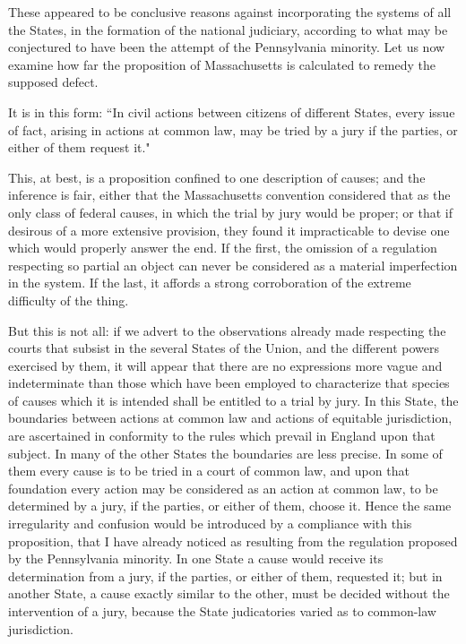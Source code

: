 These appeared to be conclusive reasons against incorporating the systems of all the States, in the formation of the national judiciary, according to what may be conjectured to have been the attempt of the Pennsylvania minority. Let us now examine how far the proposition of Massachusetts is calculated to remedy the supposed defect.

It is in this form: ``In civil actions between citizens of different States, every issue of fact, arising in actions at common law, may be tried by a jury if the parties, or either of them request it."

This, at best, is a proposition confined to one description of causes; and the inference is fair, either that the Massachusetts convention considered that as the only class of federal causes, in which the trial by jury would be proper; or that if desirous of a more extensive provision, they found it impracticable to devise one which would properly answer the end. If the first, the omission of a regulation respecting so partial an object can never be considered as a material imperfection in the system. If the last, it affords a strong corroboration of the extreme difficulty of the thing.

But this is not all: if we advert to the observations already made respecting the courts that subsist in the several States of the Union, and the different powers exercised by them, it will appear that there are no expressions more vague and indeterminate than those which have been employed to characterize that species of causes which it is intended shall be entitled to a trial by jury. In this State, the boundaries between actions at common law and actions of equitable jurisdiction, are ascertained in conformity to the rules which prevail in England upon that subject. In many of the other States the boundaries are less precise. In some of them every cause is to be tried in a court of common law, and upon that foundation every action may be considered as an action at common law, to be determined by a jury, if the parties, or either of them, choose it. Hence the same irregularity and confusion would be introduced by a compliance with this proposition, that I have already noticed as resulting from the regulation proposed by the Pennsylvania minority. In one State a cause would receive its determination from a jury, if the parties, or either of them, requested it; but in another State, a cause exactly similar to the other, must be decided without the intervention of a jury, because the State judicatories varied as to common-law jurisdiction.

